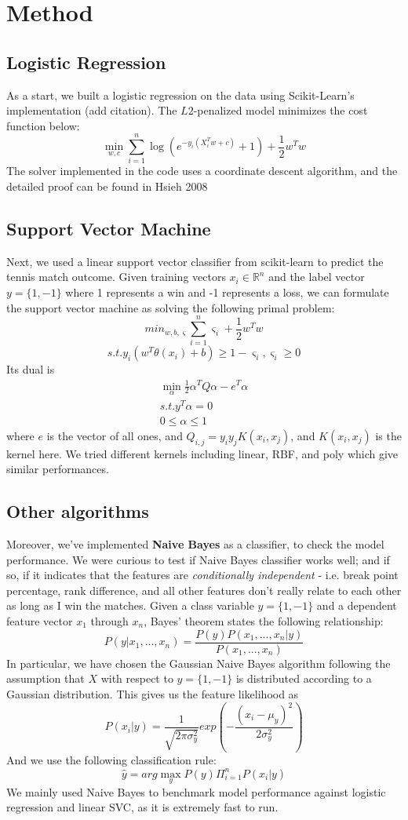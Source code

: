 \documentclass[paper=a4, fontsize=10pt]{scrartcl} %
\numberwithin{equation}{section} %
\numberwithin{figure}{section} %
\numberwithin{table}{section} %
\begin{document}
\section{Method}
\subsection{Logistic Regression}
As a start, we built a logistic regression on the data using Scikit-Learn's implementation (add citation). The $L2$-penalized model minimizes the cost function below: $$\min_{w,c} \sum_{i=1}^n \log(e^{-y_i(X_i^Tw+c)}+1) + \frac{1}{2}w^Tw$$
The solver implemented in the code uses a coordinate descent algorithm, and the detailed proof can be found in Hsieh 2008 \cite{hsieh2008dual}
\subsection{Support Vector Machine}
Next, we used a linear support vector classifier from scikit-learn \cite{scikit-learn} to predict the tennis match outcome. Given training vectors $x_i \in \mathbb{R}^n$ and the label vector $y = \{1,-1\}$ where 1 represents a win and -1 represents a loss, we can formulate the support vector machine as solving the following primal problem: $$min_{w,b, \varsigma} \sum_{i=1}^n \varsigma_i + \frac{1}{2}w^Tw$$ 
$$s.t. y_i(w^T\theta(x_i) + b) \geq 1 - \varsigma_i,    \varsigma_i \geq 0$$
Its dual is \begin{align*}
\min_\alpha \frac{1}{2}\alpha^TQ\alpha - e^T\alpha \\
s.t. y^T \alpha = 0 \\
0 \le \alpha \le 1 
\end{align*}
where $e$ is the vector of all ones, and $Q_{i,j} = y_i y_j K(x_i, x_j)$, and $K(x_i, x_j)$ is the kernel here. We tried different kernels including linear, RBF, and poly which give similar performances. 
\subsection{Other algorithms}
Moreover, we've implemented \textbf{Naive Bayes} as a classifier, to check the model performance. We were curious to test if Naive Bayes classifier works well; and if so, if it indicates that the features are \textit{conditionally independent} - i.e. break point percentage, rank difference, and all other features don't really relate to each other as long as I win the matches. Given a class variable $y = \{1,-1\}$  and a dependent feature vector $x_1$ through $x_n$, Bayes’ theorem states the following relationship: $$P(y|x_1,...,x_n) = \frac{P(y)P(x_1,...,x_n|y)}{P(x_1,...,x_n)}$$
In particular, we have chosen the Gaussian Naive Bayes algorithm following the assumption that $X$ with respect to $y = \{1,-1\}$ is distributed according to a Gaussian distribution. This gives us the feature likelihood as $$P(x_i | y) = \frac{1}{\sqrt{2\pi \sigma_y^2}} exp(-\frac{(x_i - \mu_y)^2}{2\sigma_y^2})$$
And we use the following classification rule:
$$\hat{y} = arg \max_y P(y) \Pi_{i=1}^n P(x_i | y)$$
We mainly used Naive Bayes to benchmark model performance against logistic regression and linear SVC, as it is extremely fast to run.
\end{document}
